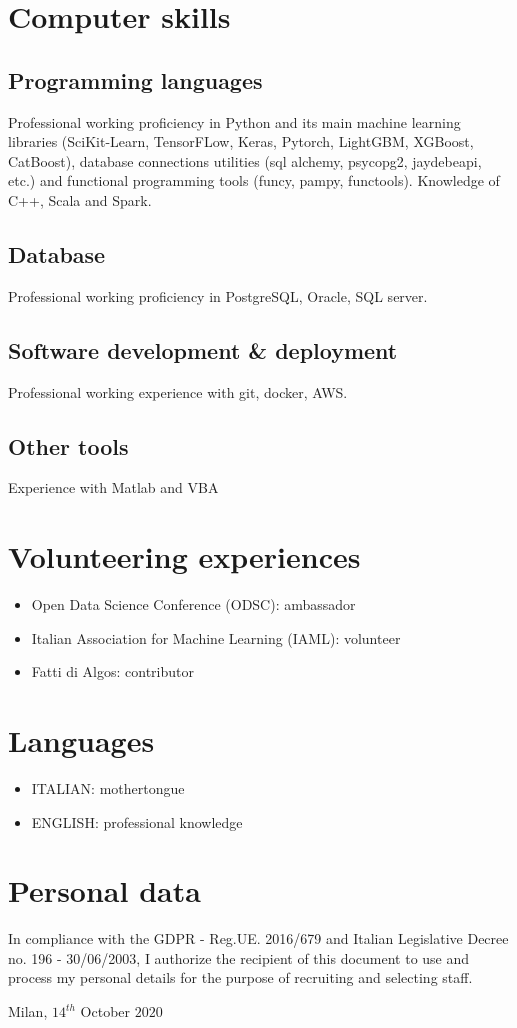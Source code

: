 \documentclass[11pt,a4paper,sans]{moderncv}        %
\begin{document}
\section{Computer skills}
\subsection{Programming languages}
Professional working proficiency in Python and its main machine learning libraries (SciKit-Learn, TensorFLow, Keras, Pytorch, LightGBM, XGBoost, CatBoost), database connections utilities (sql alchemy, psycopg2, jaydebeapi, etc.) and functional programming tools (funcy, pampy, functools). Knowledge of C++, Scala and Spark.
\subsection{Database}
Professional working proficiency in PostgreSQL, Oracle, SQL server.
\subsection{Software development \& deployment}
Professional working experience with git, docker, AWS.
\subsection{Other tools}
Experience with Matlab and VBA

\section{Volunteering experiences}
\begin{itemize}
 \item Open Data Science Conference (ODSC): ambassador
 \item Italian Association for Machine Learning (IAML): volunteer
 \item Fatti di Algos: contributor
\end{itemize} 

\section{Languages}
\begin{itemize}
 \item ITALIAN: mothertongue
 \item ENGLISH: professional knowledge
\end{itemize} 

\section{Personal data}
In compliance with the GDPR - Reg.UE. 2016/679 and Italian Legislative Decree no. 196 - 30/06/2003, I authorize the recipient of this document to use and process my personal details for the purpose of recruiting and selecting staff. 


\bigskip 
\bigskip
\bigskip 
\bigskip 
\bigskip 
\bigskip 
\bigskip 
\bigskip 
\bigskip 
\bigskip 
\bigskip 
\bigskip 
Milan, $14^{th}$ October $2020$
\end{document}

